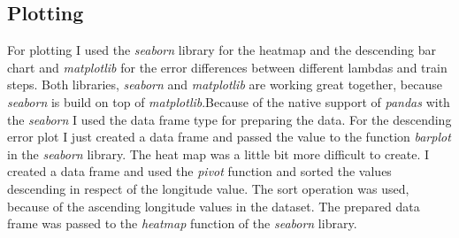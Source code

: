 \documentclass[10pt, a4paper, twocolumn]{article} %
\begin{document}
\subsection{Plotting}
For plotting I used the \textit{seaborn} library for the heatmap and the descending bar chart and \textit{matplotlib} for the error differences between different lambdas and train steps. Both libraries,
\textit{seaborn} and \textit{matplotlib} are working great together, because \textit{seaborn} is build on top of \textit{matplotlib}.Because of the native support of \textit{pandas} with the \textit{seaborn} I used the data frame type for preparing the data. For the descending error plot I just created a data frame and passed the value to the function \textit{barplot} in the \textit{seaborn} library. The heat map was a little bit more difficult to create. I created a data frame and used the \textit{pivot} function and sorted the values descending in respect of the longitude value. The sort operation was used, because of the ascending longitude values in the dataset. The prepared data frame was passed to the \textit{heatmap} function of the \textit{seaborn} library. 
\end{document}

